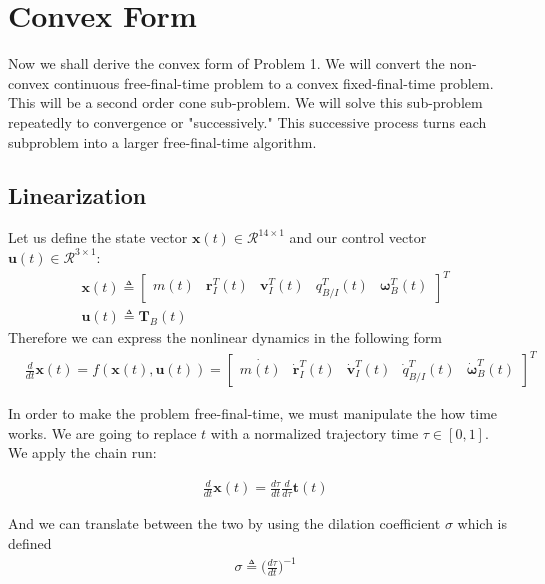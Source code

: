 \section{Convex Form}
Now we shall derive the convex form of Problem 1. We will convert the non-convex continuous free-final-time problem to a convex fixed-final-time problem. This will be a second order cone sub-problem. We will solve this sub-problem repeatedly to convergence or "successively." This successive process turns each subproblem into a larger free-final-time algorithm.

\subsection{Linearization}
Let us define the state vector $\mathbf{x}(t) \in \mathcal{R}^{14\times 1}$ and our control vector $\mathbf{u}(t) \in \mathcal{R}^{3\times 1}$:
\begin{align}
& \mathbf{x}(t) \triangleq 
	\begin{bmatrix}
	m(t) & \mathbf{r}_I^T(t) & \mathbf{v}_I^T(t) & q_{B/I}^T(t) & \bm{\omega}_B^T(t)   
	\end{bmatrix}^T \\
& \mathbf{u}(t) \triangleq \mathbf{T}_B(t)  
\end{align}
Therefore we can express the nonlinear dynamics in the following form
\begin{align}
& \frac{d}{dt}\mathbf{x}(t) = f(\mathbf{x}(t), \mathbf{u}(t)) =  
	\begin{bmatrix}
	\dot{m(t)} & \dot{\mathbf{r}}_I^T(t) & \dot{\mathbf{v}}_I^T(t) & \dot{q}_{B/I}^T(t) & \dot{\bm{\omega}}_B^T(t)  
	\end{bmatrix}^T
\end{align}

In order to make the problem free-final-time, we must manipulate the how time works. We are going to replace $t$ with a normalized trajectory time $\tau \in \left[0,1\right]$. We apply the chain run:


\begin{align}
& \frac{d}{dt}\mathbf{x}(t) = \frac{d\tau}{dt} \frac{d}{d\tau}\mathbf{t}(t)
\end{align}

And we can translate between the two by using the dilation coefficient $\sigma$ which is defined
\begin{align}
& \sigma \triangleq \Big(\frac{d\tau}{dt}\Big)^{-1}
\end{align}


